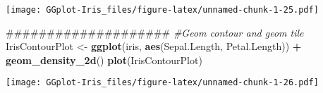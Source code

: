 \documentclass[]{article}
\newenvironment{Shaded}{\begin{snugshade}}{\end{snugshade}}
\newcommand{\KeywordTok}[1]{\textcolor[rgb]{0.13,0.29,0.53}{\textbf{#1}}}
\newcommand{\StringTok}[1]{\textcolor[rgb]{0.31,0.60,0.02}{#1}}
\newcommand{\CommentTok}[1]{\textcolor[rgb]{0.56,0.35,0.01}{\textit{#1}}}
\newcommand{\OperatorTok}[1]{\textcolor[rgb]{0.81,0.36,0.00}{\textbf{#1}}}
\newcommand{\NormalTok}[1]{#1}
\begin{document}
\texttt{[image: GGplot-Iris\_files/figure-latex/unnamed-chunk-1-25.pdf]}

\begin{Shaded}
\begin{Highlighting}[]
\NormalTok{####################}
\CommentTok{#Geom contour and geom tile}
\NormalTok{IrisContourPlot <-}\StringTok{ }\KeywordTok{ggplot}\NormalTok{(iris, }\KeywordTok{aes}\NormalTok{(Sepal.Length, Petal.Length)) }\OperatorTok{+}\StringTok{ }\KeywordTok{geom_density_2d}\NormalTok{()}
\KeywordTok{plot}\NormalTok{(IrisContourPlot)}
\end{Highlighting}
\end{Shaded}

\texttt{[image: GGplot-Iris\_files/figure-latex/unnamed-chunk-1-26.pdf]}
\end{document}
